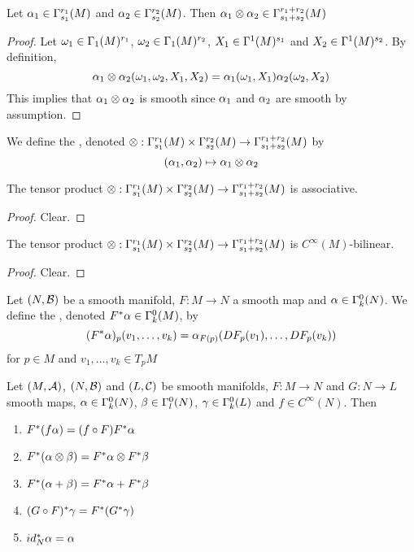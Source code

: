 \documentclass{book}
\begin{document}
	\begin{ex}
	Let $\alpha_1 \in \Gamma^{r_1}_{s_1}(M)$ and $\alpha_2 \in \Gamma^{r_2}_{s_2}(M)$. Then $\alpha_1 \otimes \alpha_2 \in \Gamma^{r_1 + r_2}_{s_1 + s_2}(M)$
	\end{ex}
	
	\begin{proof}
	Let $\omega_1 \in \Gamma_1(M)^{r_1}$, $\omega_2 \in \Gamma_1(M)^{r_2}$, $X_1 \in \Gamma^1(M)^{s_1}$ and $X_2 \in \Gamma^1(M)^{s_2}$. By definition,
	$$\alpha_1 \otimes \alpha_2 (\omega_1, \omega_2, X_1, X_2) = \alpha_1(\omega_1, X_1) \alpha_2(\omega_2, X_2)$$
	This implies that $\alpha_1 \otimes \alpha_2$ is smooth since $\alpha_1$ and $\alpha_2$ are smooth by assumption.
	\end{proof}
	
	\begin{defn}
	We define the , denoted $\otimes : \Gamma^{r_1}_{s_1}(M) \times \Gamma^{r_2}_{s_2}(M) \rightarrow \Gamma^{r_1+r_2}_{s_1+s_2}(M)$ by $$(\alpha_1, \alpha_2) \mapsto \alpha_1 \otimes \alpha_2 $$
	\end{defn}	
	
	\begin{ex}
	The tensor product $\otimes : \Gamma^{r_1}_{s_1}(M) \times \Gamma^{r_2}_{s_2}(M) \rightarrow \Gamma^{r_1+r_2}_{s_1+s_2}(M)$ is associative.
	\end{ex}
	
	\begin{proof}
	Clear.
	\end{proof}
	
	\begin{ex}
	The tensor product $\otimes : \Gamma^{r_1}_{s_1}(M) \times \Gamma^{r_2}_{s_2}(M) \rightarrow \Gamma^{r_1+r_2}_{s_1+s_2}(M)$ is $C^{\infty}(M)$-bilinear.
	\end{ex}
	
	\begin{proof}
	Clear.
	\end{proof}
	
	\begin{defn}
	Let $(N, \mathcal{B})$ be a smooth manifold, $F:M \rightarrow N$ a smooth map and $\alpha \in \Gamma^0_k(N)$. We define the , denoted $F^*\alpha \in \Gamma^0_k(M)$, by  $$(F^*\alpha)_p(v_1, \dots, v_k) = \alpha_{F(p)} (DF_p(v_1), \dots, DF_p(v_k))$$ for $p \in M$ and $v_1, \dots, v_k \in T_pM$
	\end{defn}

	\begin{ex}
	Let $(M, \mathcal{A})$, $(N, \mathcal{B})$ and $(L, \mathcal{C})$ be smooth manifolds, $F:M \rightarrow N$ and $G:N \rightarrow L$ smooth maps, $\alpha \in \Gamma^0_k(N)$, $\beta  \in \Gamma^0_l(N)$, $\gamma \in \Gamma^0_k(L)$ and $f \in C^{\infty}(N)$. Then 
	\begin{enumerate}
	\item $F^*(f \alpha) = (f \circ F) F^* \alpha$
	\item $F^*(\alpha \otimes \beta) = F^*\alpha \otimes F^* \beta$
	\item $F^*(\alpha + \beta) = F^* \alpha + F^* \beta $
	\item $(G \circ F)^*\gamma = F^*(G^* \gamma)$
	\item $id_N^* \alpha = \alpha$
	\end{enumerate}
	\end{ex}
	
\end{document}
